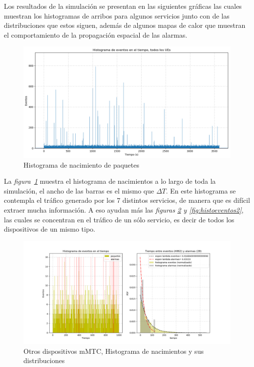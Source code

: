 Los resultados de la simulación se presentan en las siguientes gráficas las cuales muestran los histogramas de arribos para algunos servicios junto con de las distribuciones que estos siguen, además de algunos mapas de calor que muestran el comportamiento de la propagación espacial de las alarmas. \newline

\begin{figure}[th]
    \centering
    \includegraphics[scale=.55]{Figures/histoeventos.png}
    \decoRule
    \caption[Histograma de nacimientos de paquetes]{Histograma de nacimiento de paquetes}
    \label{fig:histoeventos}
\end{figure}

La \textit{figura~\ref{fig:histoeventos}} muestra el histograma de nacimientos a lo largo de toda la simulación, el ancho de las barras es el mismo que $\Delta T$. En este histograma se contempla el tráfico generado por los 7 distintos servicios, de manera que es difícil extraer mucha información. A eso ayudan más las \textit{figuras \ref{fig:histoeventos1} y \ref{fig:histoeventos2}}, las cuales se concentran en el tráfico de un sólo servicio, es decir de todos los dispositivos de un mismo tipo.\newline

\begin{figure}[th]
    \centering
    \includegraphics[scale=.55]{Figures/Otros_dispositivos_mMTC.png}
    \decoRule
    \caption[Otros dispositivos mMTC, Histograma de nacimientos y sus distribuciones]{Otros dispositivos mMTC, Histograma de nacimientos y sus distribuciones}
    \label{fig:histoeventos1}
\end{figure}

